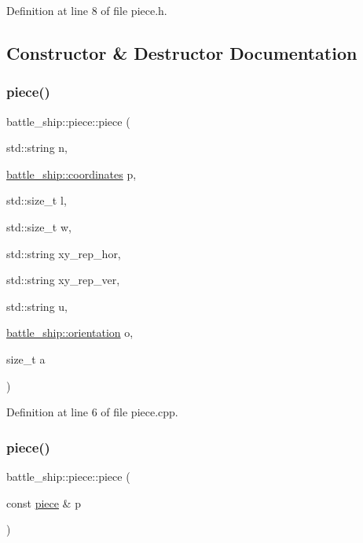 Definition at line 8 of file piece.\+h.



\subsection{Constructor \& Destructor Documentation}
\mbox{\label{classbattle__ship_1_1piece_a3c2ee9204e8dbe719fb79753f84aae63}} 
\subsubsection{\texorpdfstring{piece()}{piece()}\hspace{0.1cm}{\footnotesize\ttfamily [1/3]}}
{\footnotesize\ttfamily battle\+\_\+ship\+::piece\+::piece (\begin{DoxyParamCaption}\item[{std\+::string}]{n,  }\item[{\hyperlink{structbattle__ship_1_1coordinates}{battle\+\_\+ship\+::coordinates}}]{p,  }\item[{std\+::size\+\_\+t}]{l,  }\item[{std\+::size\+\_\+t}]{w,  }\item[{std\+::string}]{xy\+\_\+rep\+\_\+hor,  }\item[{std\+::string}]{xy\+\_\+rep\+\_\+ver,  }\item[{std\+::string}]{u,  }\item[{\hyperlink{namespacebattle__ship_aed87488f0a73f0d0679fe343fb61c784}{battle\+\_\+ship\+::orientation}}]{o,  }\item[{size\+\_\+t}]{a }\end{DoxyParamCaption})}



Definition at line 6 of file piece.\+cpp.

\mbox{\label{classbattle__ship_1_1piece_a72388913e2fe9107c6f2706adfb6054d}} 
\subsubsection{\texorpdfstring{piece()}{piece()}\hspace{0.1cm}{\footnotesize\ttfamily [2/3]}}
{\footnotesize\ttfamily battle\+\_\+ship\+::piece\+::piece (\begin{DoxyParamCaption}\item[{const \hyperlink{classbattle__ship_1_1piece}{piece} \&}]{p }\end{DoxyParamCaption})}



